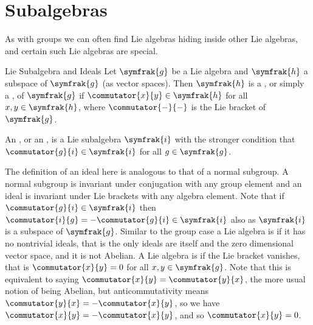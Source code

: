 \documentclass[fleqn]{NotesClass}
\renewcommand{\lie}[1]{\symfrak{#1}}
\begin{document}
    \section{Subalgebras}
    As with groups we can often find Lie algebras hiding inside other Lie algebras, and certain such Lie algebras are special.
    \begin{dfn}{Lie Subalgebra and Ideals}{}
        Let \(\lie{g}\) be a Lie algebra and \(\lie{h}\) a subspace of \(\lie{g}\) (as vector spaces).
        Then \(\lie{h}\) is a , or simply a , of \(\lie{g}\) if \(\commutator{x}{y} \in \lie{h}\) for all \(x, y \in \lie{h}\), where \(\commutator{-}{-}\) is the Lie bracket of \(\lie{g}\).
        
        An , or an , is a Lie subalgebra \(\lie{i}\) with the stronger condition that \(\commutator{g}{i} \in \lie{i}\) for all \(g \in \lie{g}\).
    \end{dfn}
    
    The definition of an ideal here is analogous to that of a normal subgroup.
    A normal subgroup is invariant under conjugation with any group element and an ideal is invariant under Lie brackets with any algebra element.
    Note that if \(\commutator{g}{i} \in \lie{i}\) then \(\commutator{i}{g} = -\commutator{g}{i} \in \lie{i}\) also as \(\lie{i}\) is a subspace of \(\lie{g}\).
    Similar to the group case a Lie algebra is  if it has no nontrivial ideals, that is the only ideals are itself and the zero dimensional vector space, and it is not Abelian.
    A Lie algebra is  if the Lie bracket vanishes, that is \(\commutator{x}{y} = 0\) for all \(x, y \in \lie{g}\).
    Note that this is equivalent to saying \(\commutator{x}{y} = \commutator{y}{x}\), the more usual notion of being Abelian, but anticommutativity means \(\commutator{y}{x} = -\commutator{x}{y}\), so we have \(\commutator{x}{y} = -\commutator{x}{y}\), and so \(\commutator{x}{y} = 0\).
    
\end{document}

